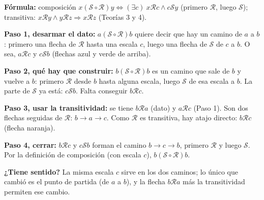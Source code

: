 \documentclass[11pt]{article}
\begin{document}
\begin{center}
\end{center}


\begin{explica}
\textbf{Fórmula:} composición $x(\mathcal S\circ\mathcal R)y\iff(\exists c)\ x\mathcal Rc\wedge c\mathcal Sy$ (primero $\mathcal R$, luego $\mathcal S$); transitiva: $x\mathcal Ry\wedge y\mathcal Rz\Rightarrow x\mathcal Rz$ (Teorías 3 y 4).

\textbf{Paso 1, desarmar el dato:} $a(\mathcal S\circ\mathcal R)b$ quiere decir que hay un camino de $a$ a $b$: primero una flecha de $\mathcal R$ hasta una escala $c$, luego una flecha de $\mathcal S$ de $c$ a $b$. O sea, $a\mathcal Rc$ y $c\mathcal Sb$ (flechas azul y verde de arriba).

\textbf{Paso 2, qué hay que construir:} $b(\mathcal S\circ\mathcal R)b$ es un camino que sale de $b$ y vuelve a $b$: primero $\mathcal R$ desde $b$ hasta alguna escala, luego $\mathcal S$ de esa escala a $b$. La parte de $\mathcal S$ ya está: $c\mathcal Sb$. Falta conseguir $b\mathcal Rc$.

\textbf{Paso 3, usar la transitividad:} se tiene $b\mathcal Ra$ (dato) y $a\mathcal Rc$ (Paso 1). Son dos flechas seguidas de $\mathcal R$: $b\to a\to c$. Como $\mathcal R$ es transitiva, hay atajo directo: $b\mathcal Rc$ (flecha naranja).

\textbf{Paso 4, cerrar:} $b\mathcal Rc$ y $c\mathcal Sb$ forman el camino $b\to c\to b$, primero $\mathcal R$ y luego $\mathcal S$. Por la definición de composición (con escala $c$), $b(\mathcal S\circ\mathcal R)b$.

\textbf{¿Tiene sentido?} La misma escala $c$ sirve en los dos caminos; lo único que cambió es el punto de partida (de $a$ a $b$), y la flecha $b\mathcal Ra$ más la transitividad permiten ese cambio.
\end{explica}
\end{document}
